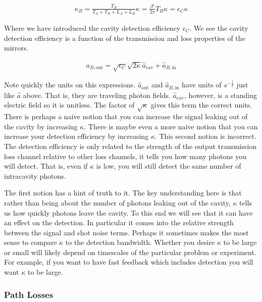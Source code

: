 \documentclass[12pt]{article}
\begin{document}
\begin{align}
\kappa_B = \frac{T_B}{T_A + T_B + L_A + L_B} \kappa = \frac{\mathcal{F}}{2\pi} T_B \kappa = \epsilon_C \kappa
\end{align}

Where we have introduced the cavity detection efficiency $\epsilon_C$. We see the cavity detection efficiency is a function of the transmission and loss properties of the mirrors.

\begin{align}
a_{B,\text{out}} = \sqrt{\epsilon_C}\sqrt{2\kappa} \hat{a}_{\text{cav}} + \hat{a}_{B,\text{in}}
\end{align}

Note quickly the units on this expressions. $\hat{a}_{\text{out}}$ and $\hat{a}_{B,\text{in}}$ have units of $s^{-\frac{1}{2}}$ just like $\hat{a}$ above. That is, they are traveling photon fields. $\hat{a}_{\text{cav}}$, however, is a standing electric field so it is unitless. The factor of $\sqrt{\kappa}$ gives this term the correct units. 
There is perhaps a naive notion that you can increase the signal leaking out of the cavity by increasing $\kappa$. There is maybe even a more naive notion that you can increase your detection efficiency by increasing $\kappa$. This second notion is incorrect. The detection efficiency is only related to the strength of the output transmission loss channel relative to other loss channels, it tells you how many photons you will detect. That is, even if $\kappa$ is low, you will still detect the same number of intracavity photons. 

The first notion has a hint of truth to it. The key understanding here is that rather than being about the number of photons leaking out of the cavity, $\kappa$ tells us how quickly photons leave the cavity. To this end we will see that it can have an effect on the detection. In particular it comes into the relative strength between the signal and shot noise terms. Perhaps it sometimes makes the most sense to compare $\kappa$ to the detection bandwidth. Whether you desire $\kappa$ to be large or small will likely depend on timescales of the particular problem or experiment. For example, if you want to have fast feedback which includes detection you will want $\kappa$ to be large.

\subsubsection{Path Losses}
\end{document}
